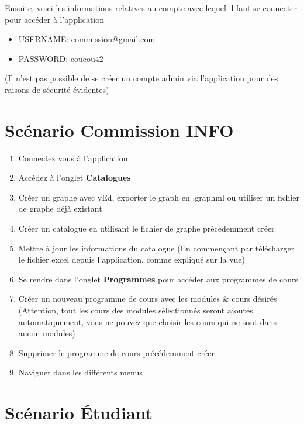 Ensuite, voici les informations relatives au compte avec lequel il faut se connecter pour accéder à l'application
\begin{itemize}
  \item USERNAME: commission@gmail.com
  \item PASSWORD: coucou42
\end{itemize}

(Il n'est pas possible de se créer un compte admin via l'application pour des raisons de sécurité évidentes)

\section{Scénario Commission INFO}

\begin{enumerate}
  \item Connectez vous à l'application
  \item Accédez à l'onglet \textbf{Catalogues}
  \item Créer un graphe avec yEd, exporter le graph en .graphml ou utiliser un fichier de graphe déjà existant
  \item Créer un catalogue en utilisant le fichier de graphe précédemment créer
  \item Mettre à jour les informations du catalogue (En commençant par télécharger le fichier excel depuis l'application, comme expliqué sur la vue)
  \item Se rendre dans l'onglet \textbf{Programmes} pour accéder aux programmes de cours
  \item Créer un nouveau programme de cours avec les modules \& cours désirés (Attention, tout les cours des modules sélectionnés seront ajoutés automatiquement, vous ne pouvez que choisir les cours qui ne sont dans aucun modules)
  \item Supprimer le programme de cours précédemment créer
  \item Naviguer dans les différents menus

\end{enumerate}

\section{Scénario Étudiant}


